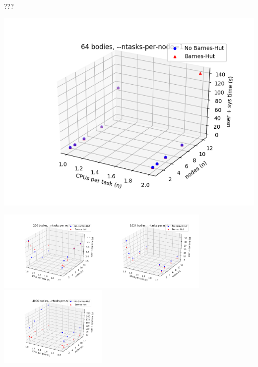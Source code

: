 \documentclass{beamer}
\begin{document}
\begin{frame}[allowframebreaks]{???}
\framebreak

\includegraphics[width=\linewidth]{64-cpusPerTask-nodes-just_1_tpn}

\framebreak

\includegraphics[width=5.2cm]{256-cpusPerTask-nodes-just_1_tpn}\includegraphics[width=5.2cm]{1024-cpusPerTask-nodes-just_1_tpn}\includegraphics[width=5.2cm]{4096-cpusPerTask-nodes-just_1_tpn}


\end{frame}
\end{document}
